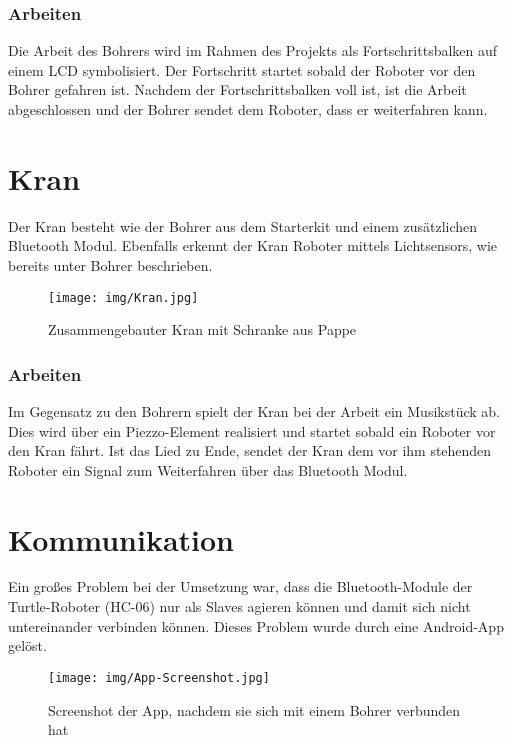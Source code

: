 \subsubsection{Arbeiten}
Die Arbeit des Bohrers wird im Rahmen des Projekts als Fortschrittsbalken auf einem LCD symbolisiert. Der Fortschritt startet sobald der Roboter vor den Bohrer gefahren ist. Nachdem der Fortschrittsbalken voll ist, ist die Arbeit abgeschlossen und der Bohrer sendet dem Roboter, dass er weiterfahren kann.

\section{Kran}
Der Kran besteht wie der Bohrer aus dem Starterkit und einem zusätzlichen Bluetooth Modul. Ebenfalls erkennt der Kran Roboter mittels Lichtsensors, wie bereits unter Bohrer beschrieben.
\begin{figure}[h]
\begin{center}
\texttt{[image: img/Kran.jpg]}
\caption{Zusammengebauter Kran mit Schranke aus Pappe} \label{kran_img}
\end{center}
\end{figure}
\subsubsection{Arbeiten}
Im Gegensatz zu den Bohrern spielt der Kran bei der Arbeit ein Musikstück ab. Dies wird über ein Piezzo-Element realisiert und startet sobald ein Roboter vor den Kran fährt. Ist das Lied zu Ende, sendet der Kran dem vor ihm stehenden Roboter ein Signal zum Weiterfahren über das Bluetooth Modul.

\section{Kommunikation}
Ein großes Problem bei der Umsetzung war, dass die Bluetooth-Module der Turtle-Roboter (HC-06) nur als Slaves agieren können und damit sich nicht untereinander verbinden können. Dieses Problem wurde durch eine Android-App gelöst.
\begin{figure}[h]
\begin{center}
\texttt{[image: img/App-Screenshot.jpg]}
\caption{Screenshot der App, nachdem sie sich mit einem Bohrer verbunden hat}\label{screen_app}
\end{center}
\end{figure}

